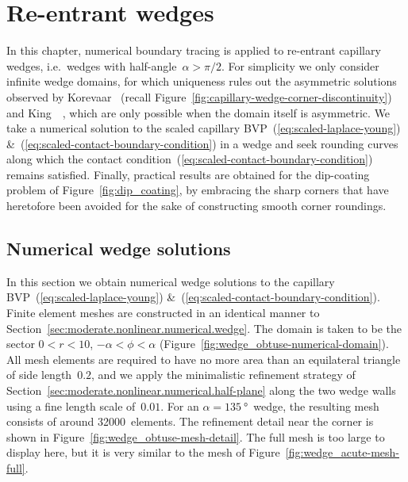 \chapter{Re-entrant wedges}
\label{ch:re-entrant}

In this chapter,
numerical boundary tracing is applied to re-entrant capillary wedges,
i.e.~wedges with half-angle~$\alpha > \pi/2$.
For simplicity we only consider infinite wedge domains,
for which uniqueness rules out the asymmetric solutions observed by
Korevaar~\cite{korevaar-1980-capillary-re-entrant-corner}
(recall Figure~\ref{fig:capillary-wedge-corner-discontinuity})
and King~\etal~\cite{king-1999-laplace-young-near-corner},
which are only possible when the domain itself is asymmetric.
We take a numerical solution to
the scaled capillary BVP~(\ref{eq:scaled-laplace-young})
\&~(\ref{eq:scaled-contact-boundary-condition})
in a wedge
and seek rounding curves along which
the contact condition~(\ref{eq:scaled-contact-boundary-condition})
remains satisfied.
Finally, practical results are obtained for the dip-coating problem
of Figure~\ref{fig:dip_coating},
by embracing the sharp corners
that have heretofore been avoided
for the sake of constructing smooth corner roundings.

\section{Numerical wedge solutions}
\label{sec:re-entrant.numerical}

In this section we obtain numerical wedge solutions
to the capillary BVP~(\ref{eq:scaled-laplace-young})
\&~(\ref{eq:scaled-contact-boundary-condition}).
Finite element meshes are constructed in an identical manner
to Section~\ref{sec:moderate.nonlinear.numerical.wedge}.
The domain is taken to be the sector $0 < r < 10$, $-\alpha < \phi < \alpha$
(Figure~\ref{fig:wedge_obtuse-numerical-domain}).
All mesh elements are required to have no more area
than an equilateral triangle of side length~$0.2$,
and we apply the minimalistic refinement strategy
of Section~\ref{sec:moderate.nonlinear.numerical.half-plane}
along the two wedge walls
using a fine length scale of~$0.01$.
For an $\alpha = \SI{135}{\degree}$~wedge,
the resulting mesh consists of around 32000~elements.
The refinement detail near the corner
is shown in Figure~\ref{fig:wedge_obtuse-mesh-detail}.
The full mesh is too large to display here,
but it is very similar to the mesh of Figure~\ref{fig:wedge_acute-mesh-full}.

